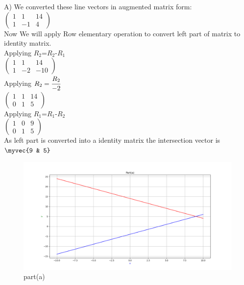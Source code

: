 A)
We converted these line vectors in augmented matrix form:\\ 

$\begin{pmatrix}
1 & 1 & 14\\
1 & -1 & 4
\end{pmatrix}$\\
 

Now We will apply Row elementary operation to convert left part of matrix to identity matrix.\\

Applying $R_{2}$=$R_{2}$-$R_{1}$\\

$\begin{pmatrix}
1 & 1 & 14\\
1 & -2 & -10
\end{pmatrix}$\\

Applying $R_{2}=\cfrac{R_{2}}{-2}$\\

$\begin{pmatrix}
1 & 1 & 14\\
0 & 1 & 5
\end{pmatrix}$\\

Applying $R_{1}$=$R_{1}$-$R_{2}$\\

$\begin{pmatrix}
1 & 0 & 9\\
0 & 1 & 5
\end{pmatrix}$\\

As left part is converted into a identity matrix the intersection vector is $\myvec{9 & 5}$\\

\renewcommand{\thefigure}{\theenumi.\arabic{figure}}
\begin{figure}[!ht]
    \centering
    \includegraphics[width=\columnwidth]{./figures/A1_parta}
\caption{part(a)}
\label{fig: part(a)}
\end{figure}


